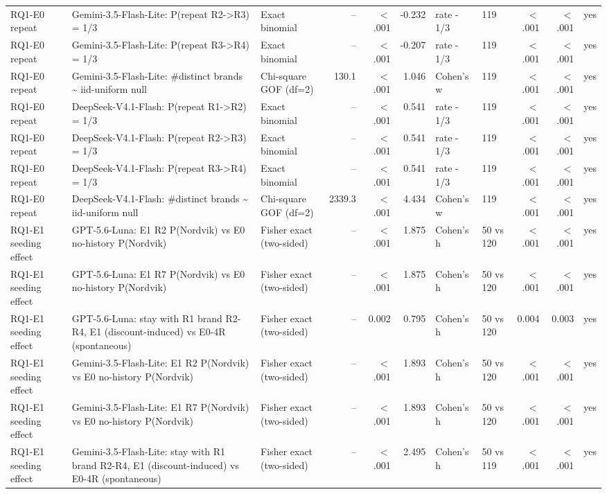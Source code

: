 \begin{table}[htbp]
\begin{tabular}{lllrrrllrrr}
RQ1-E0 repeat & Gemini-3.5-Flash-Lite: P(repeat R2->R3) = 1/3 & Exact binomial & -- & $<$.001 & -0.232 & rate - 1/3 & 119 & $<$.001 & $<$.001 & yes \\
RQ1-E0 repeat & Gemini-3.5-Flash-Lite: P(repeat R3->R4) = 1/3 & Exact binomial & -- & $<$.001 & -0.207 & rate - 1/3 & 119 & $<$.001 & $<$.001 & yes \\
RQ1-E0 repeat & Gemini-3.5-Flash-Lite: \#distinct brands \textasciitilde{} iid-uniform null & Chi-square GOF (df=2) & 130.1 & $<$.001 & 1.046 & Cohen's w & 119 & $<$.001 & $<$.001 & yes \\
RQ1-E0 repeat & DeepSeek-V4.1-Flash: P(repeat R1->R2) = 1/3 & Exact binomial & -- & $<$.001 & 0.541 & rate - 1/3 & 119 & $<$.001 & $<$.001 & yes \\
RQ1-E0 repeat & DeepSeek-V4.1-Flash: P(repeat R2->R3) = 1/3 & Exact binomial & -- & $<$.001 & 0.541 & rate - 1/3 & 119 & $<$.001 & $<$.001 & yes \\
RQ1-E0 repeat & DeepSeek-V4.1-Flash: P(repeat R3->R4) = 1/3 & Exact binomial & -- & $<$.001 & 0.541 & rate - 1/3 & 119 & $<$.001 & $<$.001 & yes \\
RQ1-E0 repeat & DeepSeek-V4.1-Flash: \#distinct brands \textasciitilde{} iid-uniform null & Chi-square GOF (df=2) & 2339.3 & $<$.001 & 4.434 & Cohen's w & 119 & $<$.001 & $<$.001 & yes \\
RQ1-E1 seeding effect & GPT-5.6-Luna: E1 R2 P(Nordvik) vs E0 no-history P(Nordvik) & Fisher exact (two-sided) & -- & $<$.001 & 1.875 & Cohen's h & 50 vs 120 & $<$.001 & $<$.001 & yes \\
RQ1-E1 seeding effect & GPT-5.6-Luna: E1 R7 P(Nordvik) vs E0 no-history P(Nordvik) & Fisher exact (two-sided) & -- & $<$.001 & 1.875 & Cohen's h & 50 vs 120 & $<$.001 & $<$.001 & yes \\
RQ1-E1 seeding effect & GPT-5.6-Luna: stay with R1 brand R2-R4, E1 (discount-induced) vs E0-4R (spontaneous) & Fisher exact (two-sided) & -- & 0.002 & 0.795 & Cohen's h & 50 vs 120 & 0.004 & 0.003 & yes \\
RQ1-E1 seeding effect & Gemini-3.5-Flash-Lite: E1 R2 P(Nordvik) vs E0 no-history P(Nordvik) & Fisher exact (two-sided) & -- & $<$.001 & 1.893 & Cohen's h & 50 vs 120 & $<$.001 & $<$.001 & yes \\
RQ1-E1 seeding effect & Gemini-3.5-Flash-Lite: E1 R7 P(Nordvik) vs E0 no-history P(Nordvik) & Fisher exact (two-sided) & -- & $<$.001 & 1.893 & Cohen's h & 50 vs 120 & $<$.001 & $<$.001 & yes \\
RQ1-E1 seeding effect & Gemini-3.5-Flash-Lite: stay with R1 brand R2-R4, E1 (discount-induced) vs E0-4R (spontaneous) & Fisher exact (two-sided) & -- & $<$.001 & 2.495 & Cohen's h & 50 vs 119 & $<$.001 & $<$.001 & yes \\

\end{tabular}
\end{table}
